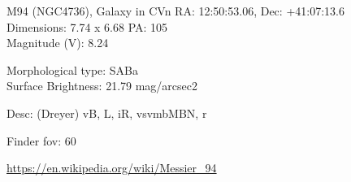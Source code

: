 \begin{block}{M94 (NGC4736), Galaxy in CVn}
    RA: 12:50:53.06, Dec: +41:07:13.6 \\ 
    Dimensions: 7.74 x 6.68 PA: 105 \\ 
    Magnitude (V): 8.24

    Morphological type: SABa \\ 
    Surface Brightness: 21.79 mag/arcsec2 

    Desc: (Dreyer) vB, L, iR, vsvmbMBN, r 

    Finder fov: 60 

    \url{https://en.wikipedia.org/wiki/Messier_94} 
\end{block}